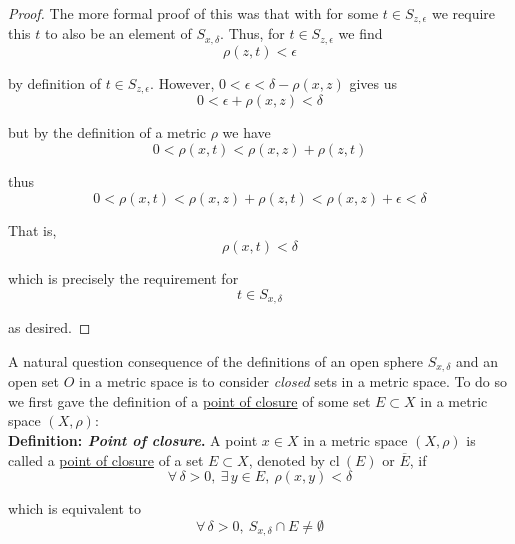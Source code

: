 \documentclass[12pt]{article}
\newlength\tindent
\renewcommand{\indent}{\hspace*{\tindent}}
\newcommand{\cl}{\mathrm{cl~}}
\renewcommand{\cl}{\mathrm{cl~}} %
\begin{document}
\begin{proof} The more formal proof of this was that with for some $t \in S_{z, \epsilon}$ we require this $t$ to also be an element of $S_{x,\delta}$. Thus, for $t \in S_{z,\epsilon}$ we find
\begin{equation*}
	\rho(z, t) < \epsilon
\end{equation*}

by definition of $t \in S_{z,\epsilon}$. However, $0 < \epsilon < \delta - \rho(x, z)$ gives us 
\begin{equation*}
	0 < \epsilon + \rho(x, z) < \delta
\end{equation*}

but by the definition of a metric $\rho$ we have
\begin{equation*}
	0 < \rho(x, t) < \rho(x, z) + \rho(z, t)
\end{equation*}

thus
\begin{equation*}
	0 < \rho(x, t) < \rho(x, z) + \rho(z, t) < \rho(x, z) + \epsilon < \delta
\end{equation*}

That is,
\begin{equation*}
	\rho(x, t) < \delta
\end{equation*}

which is precisely the requirement for
\begin{equation*}
	t \in S_{x,\delta}
\end{equation*}

as desired. 
\end{proof}

\indent A natural question consequence of the definitions of an open sphere $S_{x,\delta}$ and an open set $O$ in a metric space is to consider {\em closed} sets in a metric space. To do so we first gave the definition of a \underline{point of closure} of some set $E \subset X$ in a metric space $(X, \rho)$:  \\

%
%
{\bf Definition: {\em Point of closure}.} A point $x \in X$ in a metric space $(X, \rho)$ is called a \underline{point of closure} of a set $E \subset X$, denoted by $\cl(E)$ or $\overline{E}$, if
\begin{equation*}
	\forall\,\delta > 0,~\exists\,y\in E,~ \rho(x, y) < \delta
\end{equation*}

which is equivalent to
\begin{equation*}
	\forall\,\delta > 0, ~ S_{x,\delta} \cap E \neq \emptyset
\end{equation*}
\end{document}
